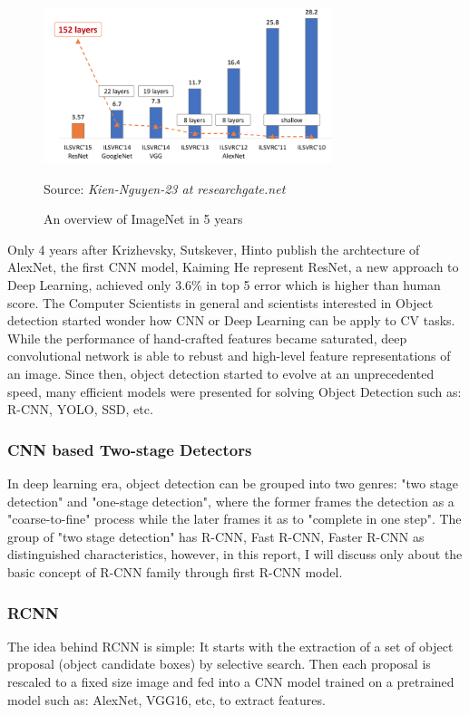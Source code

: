 \documentclass[12pt]{article}
\newcommand{\source}[1]{\caption*{Source: \emph{#1}} }
\begin{document}
\begin{figure}[htp]
    \centering
    \includegraphics[width=0.75\textwidth]{images/imagenet.png}
    \caption{An overview of ImageNet in 5 years}
    \label{fig:imagenet}
    \source{Kien-Nguyen-23 at researchgate.net}
\end{figure}

Only 4 years after Krizhevsky, Sutskever, Hinto publish the archtecture of AlexNet\cite{krizhevsky2012imagenet}, 
the first CNN model, Kaiming He represent ResNet\cite{he2015deep}, a new approach to Deep Learning, 
achieved only 3.6\% in top 5 error which is higher than human score. The Computer Scientists 
in general and scientists interested in Object detection started wonder how CNN or Deep Learning 
can be apply to CV tasks. While the performance of hand-crafted features became saturated, deep convolutional network 
is able to rebust and high-level feature representations of an image. Since then, object detection
started to evolve at an unprecedented speed, many efficient models were 
presented for solving Object Detection such as: R-CNN\cite{girshick2014rich}, 
YOLO\cite{redmon2016you}, SSD\cite{liu2016ssd}, etc.

\subsubsection{CNN based Two-stage Detectors}
\label{sec:two_stage}
In deep learning era, object detection can be grouped into two genres: "two stage 
detection" and "one-stage detection", where the former frames the detection as a 
"coarse-to-fine" process while the later frames it as to "complete in one step".
The group of "two stage detection" has R-CNN, Fast R-CNN, Faster R-CNN as 
distinguished characteristics, however, in this report, I will discuss only about 
the basic concept of R-CNN family through first R-CNN model.
\subsubsection*{RCNN}
The idea behind RCNN is simple: It starts with the extraction of a set of object 
proposal (object candidate boxes) by selective search. Then each proposal is 
rescaled to a fixed size image and fed into a CNN model trained on a pretrained model 
such as: AlexNet, VGG16, etc, to extract features. 
\end{document}
